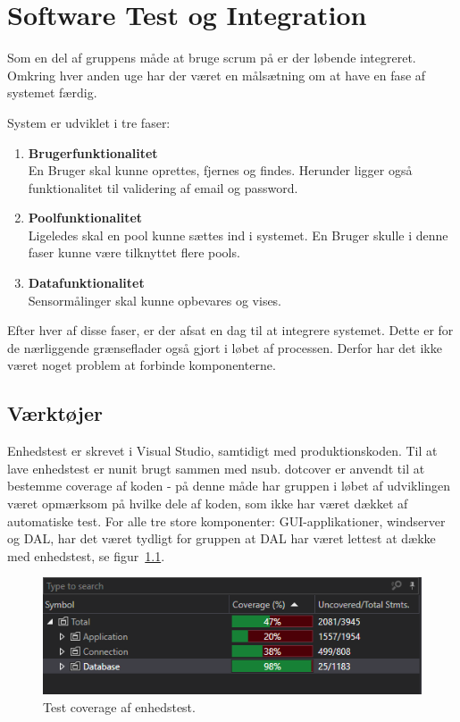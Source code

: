 \chapter{Software Test og Integration}

Som en del af gruppens måde at bruge scrum på er der løbende integreret. Omkring hver anden uge har der været en målsætning om at have en fase af systemet færdig. 

System er udviklet i tre faser: 

\begin{enumerate}
	\item \textbf{Brugerfunktionalitet}\\
	En Bruger skal kunne oprettes, fjernes og findes. Herunder ligger også funktionalitet til validering af email og password. 
	\item \textbf{Poolfunktionalitet}\\
	Ligeledes skal en pool kunne sættes ind i systemet. En Bruger skulle i denne faser kunne være tilknyttet flere pools.
	\item \textbf{Datafunktionalitet}\\
	Sensormålinger skal kunne opbevares og vises. 
\end{enumerate}

Efter hver af disse faser, er der afsat en dag til at integrere systemet. Dette er for de nærliggende grænseflader også gjort i løbet af processen. Derfor har det ikke været noget problem at forbinde komponenterne. 

\section{Værktøjer}
Enhedstest er skrevet i Visual Studio, samtidigt med produktionskoden. Til at lave enhedstest er \gls{nunit} brugt sammen med \gls{nsub}. 
\gls{dotcover} er anvendt til at bestemme coverage af koden - på denne måde har gruppen i løbet af udviklingen været opmærksom på hvilke dele af koden, som ikke har været dækket af automatiske test.
For alle tre store komponenter: GUI-applikationer, \gls{windserver} og DAL, har det været tydligt for gruppen at DAL har været lettest at dække med enhedstest, se figur~\ref{fig:coverage}.

\begin{figure}[h]
	\centering
	\includegraphics[width=0.8\linewidth]{figs/test/coverage}
	\caption{Test coverage af enhedstest.}
	\label{fig:coverage}
\end{figure}

